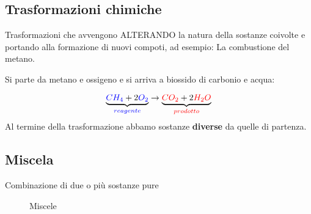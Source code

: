 \subsection{Trasformazioni chimiche}
\label{sec:trasformazionichimiche}

Trasformazioni che avvengono ALTERANDO la natura della sostanze coivolte e portando alla formazione di nuovi compoti,
ad esempio: La combustione del metano.
\begin{center}
  Si parte da {\color{blue}metano} e {\color{blue}ossigeno} e si arriva a {\color{red}biossido di carbonio} e
  {\color{red}acqua}:
\end{center}
\begin{equation}
  \label{eq:esreagprod}
  \underbrace{{\color{blue}CH_4}+2{\color{blue}O_2}}_{\color{blue}reagente} \to \underbrace{{\color{red}CO_2}+2
  {\color{red}H_2O}}_{\color{red}prodotto}
\end{equation}
Al termine della trasformazione abbamo sostanze \textbf{diverse} da quelle di partenza.

\subsection{Miscela}
\label{sec:misc}

Combinazione di due o più sostanze pure
\begin{figure}[ht!]
  \centering
  \resizebox{5.5in}{!}{}
  \caption{Miscele}
  \label{fig:miscela}
\end{figure}
